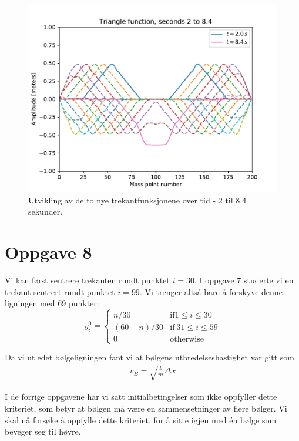 \documentclass[12p,a4paper]{report}
\begin{document}
\begin{figure}[H]
\centering
\includegraphics[width=\textwidth]{../fig/triangle_collapse2.pdf}
\caption{Utvikling av de to nye trekantfunksjonene over tid - 2 til 8.4 sekunder.}
\label{fig:tri2}
\end{figure}




\section*{Oppgave 8}
Vi kan først sentrere trekanten rundt punktet $i = 30$. I oppgave 7 studerte vi en trekant sentrert rundt punktet $i = 99$. Vi trenger altså bare å forskyve denne ligningen med 69 punkter:
\begin{equation}\label{eqn:initial}
y_i^0 = \begin{cases}
n/30 & \mathrm{if} 1 \leq i \leq 30 \\
(60-n)/30 & \mathrm{if}\: 31 \leq i \leq 59\\
0 & \mathrm{otherwise}
\end{cases}
\end{equation}

Da vi utledet bølgeligningen fant vi at bølgens utbredelseshastighet var gitt som
\begin{align*}
v_B = \sqrt{\frac{k}{m}}\Delta x
\end{align*}

I de forrige oppgavene har vi satt initialbetingelser som ikke oppfyller dette kriteriet, som betyr at bølgen må være en sammensetninger av flere bølger. Vi skal nå forsøke å oppfylle dette kriteriet, for å sitte igjen med én bølge som beveger seg til høyre.
\end{document}
